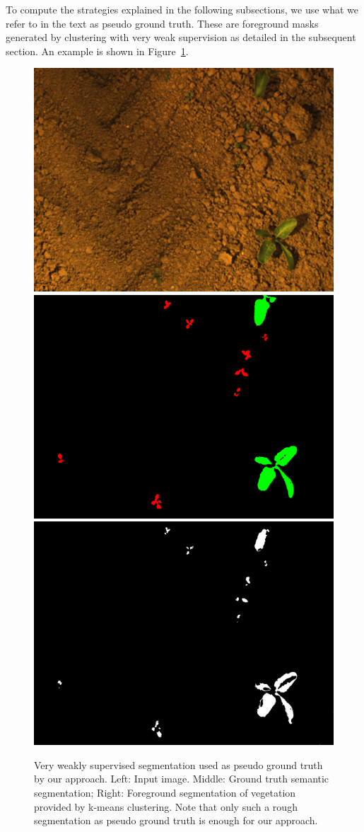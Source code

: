 \documentclass[letterpaper, 10 pt, conference]{ieeeconf}  %
\begin{document}

To compute the strategies explained in the following subsections, we use what we refer to in the text as pseudo ground truth. These are foreground masks generated by clustering with very weak supervision as detailed in the subsequent section. An example is shown in Figure~\ref{fig:unsupervised_foreground}.

\begin{figure}
 \vspace{1em}
    \centering
    \includegraphics[width=0.32\linewidth]{pics/unsupervised/img_masks_8mm_fromImages_frame256.png}
    \includegraphics[width=0.32\linewidth]{pics/unsupervised/gt_masks_8mm_fromImages_frame256_GroundTruth_iMap.png}
    \includegraphics[width=0.32\linewidth]{pics/unsupervised/lbl_masks_8mm_fromImages_frame256.png}
    \caption{Very weakly supervised segmentation used as pseudo ground
      truth by our approach.  Left: Input image. Middle: Ground truth semantic
      segmentation; Right: Foreground segmentation of vegetation
      provided by k-means clustering. Note that only such a rough
      segmentation as pseudo ground truth is enough for our approach.}
    \label{fig:unsupervised_foreground}
      \vspace{-2em}
\end{figure}
\end{document}
